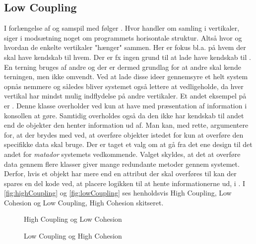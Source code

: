 \subsection{Low Coupling}\label{Chapter:Design patterns:Anvendelse:Low Coupling}
I forlængelse af og samspil med  følger . Hvor  handler om samling i vertikaler, siger  i modsætning noget om programmets horisontale struktur. Altså hvor og hvordan de enkelte vertikaler "hænger" sammen. Her er fokus bl.a. på hvem der skal have kendskab til hvem. Der er fx ingen grund til at lade  have kendskab til . En terning bruges af andre og der er dermed grundlag for at andre skal kende terningen, men ikke omvendt. Ved at lade disse ideer gennemsyre et helt system opnås  nemmere og således bliver systemet også lettere at vedligeholde, da hver vertikal har mindst mulig indflydelse på andre vertikaler. Et andet eksempel på  er . Denne klasse overholder  ved kun at have med præsentation af information i konsollen at gøre. Samtidig overholdes også  da den ikke har kendskab til andet end de objekter den henter information ud af. Man kan, med rette, argumentere for, at der brydes med  ved, at overføre objekter istedet for kun at overføre den specifikke data  skal bruge. Der er taget et valg om at gå fra det ene design til det andet for \textit{matador} systemets vedkommende. Valget skyldes, at det at overføre data gennem flere klasser giver mange redundante metoder gennem systemet. Derfor, hvis et objekt har mere end en attribut der skal overføres til  kan der spares en del kode ved, at placere logikken til at hente informationerne ud, i . I \vref{fig:highCoupling} og \vref{fig:lowCoupling} ses henholdsvis High Coupling, Low Cohesion og Low Coupling, High Cohesion skitseret.

\begin{figure}
\caption{High Coupling og Low Cohesion}
\label{fig:highCoupling}
\centering

\end{figure}

\begin{figure}
\caption{Low Coupling og High Cohesion}
\label{fig:lowCoupling}
\centering

\end{figure}

